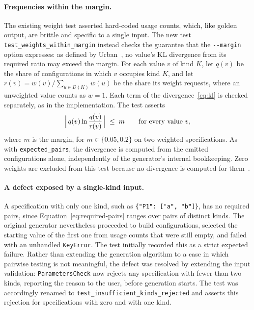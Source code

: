\documentclass[
  digital, %
  oneside, %
  lof,     %
  nolot,     %
]{fithesis4}
\begin{document}
\paragraph{Frequencies within the margin.} The existing weight test asserted
hard-coded usage counts, which, like golden output, are brittle and specific to a
single input. The new test \texttt{test\_weights\_within\_margin} instead checks
the guarantee that the \texttt{-{}-margin} option expresses: as defined by
Urban~\cite[p.~24]{Urban2024thesis}, no value's \gls{KL} divergence from its
required ratio may exceed the margin. For each value $v$
of kind $K$, let $q(v)$ be the share of configurations in which $v$ occupies
kind $K$, and let $r(v) = w(v) / \sum_{u \in D(K)} w(u)$ be the share its weight
requests, where an unweighted value counts as $w = 1$. Each term of the
divergence~\eqref{eq:kl} is checked separately, as in the implementation. The test asserts
%
\begin{equation}
  \label{eq:margin}
  \Bigl|\, q(v) \ln \frac{q(v)}{r(v)} \,\Bigr| \;\le\; m
  \qquad \text{for every value } v,
\end{equation}
%
where $m$ is the margin, for $m \in \{0.05, 0.2\}$ on two weighted
specifications. As with \texttt{expected\_pairs}, the divergence is computed
from the emitted configurations alone, independently of the generator's
internal bookkeeping. Zero weights are excluded from this test because no
divergence is computed for them~\cite[p.~26]{Urban2024thesis}.

\paragraph{A defect exposed by a single-kind input.} A specification with only
one kind, such as \texttt{\{"P1": ["a", "b"]\}}, has no required pairs, since
Equation~\eqref{eq:required-pairs} ranges over pairs of distinct kinds. The
original generator nevertheless proceeded to build configurations, selected the
starting value of the first one from usage counts that were still empty, and
failed with an unhandled \texttt{KeyError}. The test initially recorded this as
a strict expected failure. Rather than extending the generation algorithm to a
case in which pairwise testing is not meaningful, the defect was resolved by
extending the input validation: \texttt{ParametersCheck} now rejects any
specification with fewer than two kinds, reporting the reason to the user, before
generation starts. The test was accordingly renamed to
\texttt{test\_insufficient\_kinds\_rejected} and asserts this rejection for
specifications with zero and with one kind.
\end{document}
